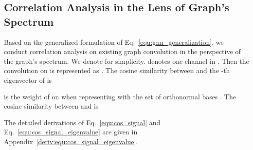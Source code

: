 \documentclass[nohyperref]{article}
\theoremstyle{plain}
\theoremstyle{definition}
\theoremstyle{remark}
\begin{document}
\subsection{Correlation Analysis in the Lens of Graph's Spectrum}
\label{sec:correlation_analysis}

Based on the generalized formulation of Eq.~\ref{equ:gnn_generalization}, we conduct correlation analysis on existing graph convolution in the perspective of the graph's spectrum.
We denote   for simplicity.
 denotes one channel in .
Then the convolution on  is represented as .
The cosine similarity between  and the -th eigenvector  of  is

 is the weight of  on  when representing  with the set of orthonormal bases .
The cosine similarity between  and  is

The detailed derivations of Eq.~\ref{equ:cos_signal} and Eq.~\ref{equ:cos_signal_eigenvalue} are given in Appendix~\ref{deriv:equ:cos_signal_eigenvalue}.
\end{document}
